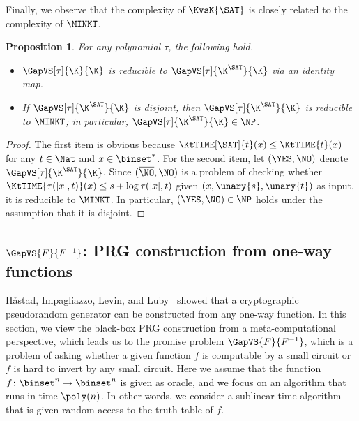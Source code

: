 \documentclass[11pt]{article}
\numberwithin{equation}{section}
\newtheorem{proposition}[theorem]{Proposition}
\theoremstyle{definition}
\theoremstyle{plain}
\begin{document}
Finally, we observe that the complexity of $\KvsK{\SAT}$
is closely related to the complexity of $\MINKT$.
\begin{proposition}
  For any polynomial $\tau$, the following hold.
  \begin{itemize}
    \item
          $\GapVS[\tau]{\K}{\K}$ is reducible to $\GapVS[\tau]{\K^\SAT}{\K}$ via an identity map.
    \item
          If $\GapVS[\tau]{\K^\SAT}{\K}$ is disjoint,
          then
          $\GapVS[\tau]{\K^\SAT}{\K}$ is reducible to
          $\MINKT$; in particular,
          $\GapVS[\tau]{\K^\SAT}{\K} \in \NP$.
  \end{itemize}
\end{proposition}

\begin{proof}
  The first item is obvious because $\KtTIME[\SAT]{t}(x) \le \KtTIME{t}(x)$ for any $t \in \Nat$ and $x \in \binset^*$.
  For the second item,
  let $(\YES, \NO)$ denote
  $\GapVS[\tau]{\K^\SAT}{\K}$.
  Since $(\overline{\NO}, \NO)$ is a problem of checking whether $\KtTIME{\tau(|x|, t)}(x) \le s + \log \tau(|x|, t)$
  given $(x, \unary{s}, \unary{t})$ as input,
  it is reducible to $\MINKT$.
  In particular, $(\YES, \NO) \in \NP$ holds under the assumption that it is disjoint.
\end{proof}


\subsection{\texorpdfstring{$\GapVS{F}{F^{-1}}$}{Gap(F vs F(-1))}: PRG construction from one-way functions}
\label{section_HILL}
H{\aa}stad, Impagliazzo, Levin, and Luby~\cite{HastadILL99_siamcomp_journals}
showed that
a cryptographic pseudorandom generator can be constructed from any one-way function.
In this section, we view the black-box PRG construction from a meta-computational perspective,
which leads us to
the promise problem
$\GapVS{F}{F^{-1}}$,
which is a problem of asking whether a given function $f$ is
computable by a small circuit
or
$f$ is hard to invert by any small circuit.
Here we assume that the function $f \colon \binset^n \to \binset^n$ is given as oracle,
and we focus on an algorithm that runs in time $\poly(n)$.
In other words, we consider a sublinear-time algorithm that is given random access to the truth table of $f$.
%
\end{document}
